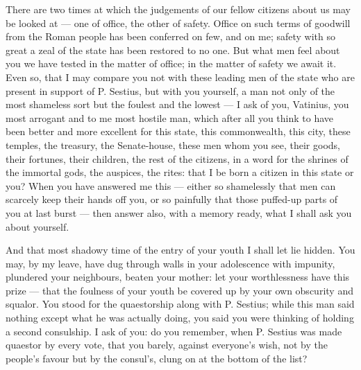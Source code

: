  There are two times at which the judgements of our fellow citizens about us may be looked at --- one of office, the other of safety. Office on such terms of goodwill from the Roman people has been conferred on few, and on me; safety with so great a zeal of the state has been restored to no one. But what men feel about you we have tested in the matter of office; in the matter of safety we await it. Even so, that I may compare you not with these leading men of the state who are present in support of P. Sestius, but with you yourself, a man not only of the most shameless sort but the foulest and the lowest --- I ask of you, Vatinius, you most arrogant and to me most hostile man, which after all you think to have been better and more excellent for this state, this commonwealth, this city, these temples, the treasury, the Senate-house, these men whom you see, their goods, their fortunes, their children, the rest of the citizens, in a word for the shrines of the immortal gods, the auspices, the rites: that I be born a citizen in this state or you? When you have answered me this --- either so shamelessly that men can scarcely keep their hands off you, or so painfully that those puffed-up parts of you at last burst --- then answer also, with a memory ready, what I shall ask you about yourself.

 And that most shadowy time of the entry of your youth I shall let lie hidden. You may, by my leave, have dug through walls in your adolescence with impunity, plundered your neighbours, beaten your mother: let your worthlessness have this prize --- that the foulness of your youth be covered up by your own obscurity and squalor. You stood for the quaestorship along with P. Sestius; while this man said nothing except what he was actually doing, you said you were thinking of holding a second consulship. I ask of you: do you remember, when P. Sestius was made quaestor by every vote, that you barely, against everyone's wish, not by the people's favour but by the consul's, clung on at the bottom of the list?

